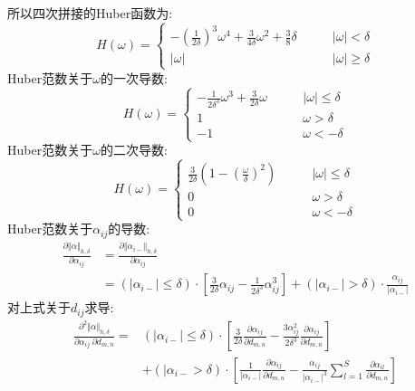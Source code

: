 \documentclass[245.0pt]{article}
\begin{document}
所以四次拼接的Huber函数为:
\begin{equation*}
H(\omega) = 
\begin{cases}
- (\frac{1}{2 \delta} )^{3} \omega^{4} + \frac{3}{4 \delta} \omega^{2} + \frac{3}{8} \delta \qquad & \vert \omega \vert < \delta \\
\vert \omega \vert & \vert \omega \vert \geq \delta
\end{cases} \tag{3.10}
\end{equation*}
Huber范数关于$\omega $的一次导数:
\begin{equation*}
H(\omega) = 
\begin{cases}
- \frac{1}{2 \delta^{3}} \omega^{3} + \frac{3}{2 \delta} \omega \qquad & \vert \omega \vert \leq \delta \\
1 & \omega > \delta \\
-1 & \omega < - \delta
\end{cases} \tag{3.11}
\end{equation*}
Huber范数关于$\omega $的二次导数:
\begin{equation*}
H(\omega) = 
\begin{cases}
\frac{3}{2 \delta} (1 - (\frac{\omega}{\delta} )^{2} ) \qquad & \vert \omega \vert \leq \delta \\
0 & \omega > \delta \\
0 & \omega < - \delta
\end{cases} \tag{3.12}
\end{equation*}
Huber范数关于$\alpha_{ij} $的导数:
\begin{equation*}
\begin{split}
\frac{\partial \Vert \alpha \Vert_{h, \delta}}{\partial \alpha_{ij}} &= \frac{\partial \Vert \alpha_{i-} \Vert_{h,\delta}}{\partial \alpha_{ij}} \\
&= ( \vert \alpha_{i-} \vert \leq \delta ) \cdot \left [ \frac{3}{2 \delta} \alpha_{ij} - \frac{1}{2 \delta^{3}} \alpha_{ij}^{3} \right ] + ( \vert \alpha_{i-} \vert > \delta ) \cdot \frac{\alpha_{ij}}{\vert \alpha_{i-} \vert}
\end{split} \tag{3.13}
\end{equation*}
对上式关于$d_{ij} $求导:
\begin{equation*}
\begin{split}
\frac{\partial^{2} \Vert \alpha \Vert_{h, \delta } } {\partial \alpha_{ij} \ \partial d_{m,n} } = & ( | \alpha_{i-} | \leq \delta ) \cdot \left [ \frac{3}{2 \delta} \frac{\partial \alpha_{ij} }{\partial d_{m,n} } - \frac{3 \alpha^{2}_{ij} }{2 \delta^{3} } \frac{\partial \alpha_{ij} }{\partial d_{m,n}} \right ] \\
&+ ( |\alpha_{i-} > \delta ) \cdot \left [ \frac{1}{|\alpha_{i-} |} \frac{\partial \alpha_{ij} }{\partial d_{m,n} } - \frac{\alpha_{ij} }{ |\alpha_{i-} |^{3} } \sum_{l = 1}^{S} \frac{\partial \alpha_{il} }{\partial d_{m,n}} \right ]
\end{split} \tag{3.14}
\end{equation*}
\end{document}
